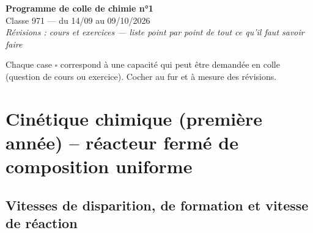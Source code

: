 \documentclass[11pt,a4paper]{article}
\begin{document}
\begin{center}
  {\LARGE\bfseries\color{bleu} Programme de colle de chimie n°1}\\[4pt]
  {\large Classe 971 --- du 14/09 au 09/10/2026}\\[6pt]
  {\itshape Révisions : cours et exercices --- liste point par point de tout ce qu'il faut savoir faire}
\end{center}

\vspace{2mm}
\noindent Chaque case $\square$ correspond à une capacité qui peut être demandée en colle
(question de cours ou exercice). Cocher au fur et à mesure des révisions.

\tableofcontents

\section{Cinétique chimique (première année) -- réacteur fermé de composition uniforme}

\subsection{Vitesses de disparition, de formation et vitesse de réaction}
\end{document}
